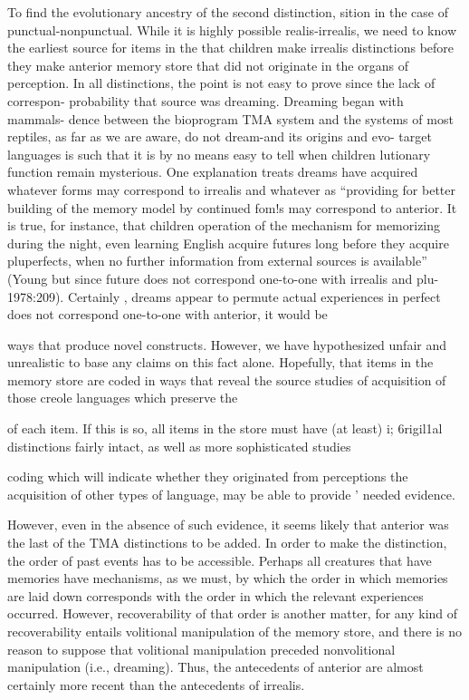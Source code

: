 To find the evolutionary ancestry of the second distinction, sition in the case of punctual-nonpunctual. While it is highly possible realis-irrealis, we need to know the earliest source for items in the that children make irrealis distinctions before they make anterior memory store that did not originate in the organs of perception. In all distinctions, the point is not easy to prove since the lack of correspon- probability that source was dreaming. Dreaming began with mammals- dence between the bioprogram TMA system and the systems of most reptiles, as far as we are aware, do not dream-and its origins and evo- target languages is such that it is by no means easy to tell when children lutionary function remain mysterious. One explanation treats dreams have acquired whatever forms may correspond to irrealis and whatever as ``providing for better building of the memory model by continued fom!s may correspond to anterior. It is true, for instance, that children operation of the mechanism for memorizing during the night, even learning English acquire futures long before they acquire pluperfects, when no further information from external sources is available'' (Young but since future does not correspond one-to-one with irrealis and plu- 1978:209). Certainly , dreams appear to permute actual experiences in perfect does not correspond one-to-one with anterior, it would be

ways that produce novel constructs. However, we have hypothesized unfair and unrealistic to base any claims on this fact alone. Hopefully, that items in the memory store are coded in ways that reveal the source studies of acquisition of those creole languages which preserve the

of each item. If this is so, all items in the store must have (at least) i; 6rigil1al distinctions fairly intact, as well as more sophisticated studies

coding which will indicate whether they originated from perceptions the acquisition of other types of language, may be able to provide ' needed evidence.


However, even in the absence of such evidence, it seems likely that anterior was the last of the TMA distinctions to be added. In order to make the distinction, the order of past events has to be accessible. Perhaps all creatures that have memories have mechanisms, as we must, by which the order in which memories are laid down corresponds with the order in which the relevant experiences occurred. However, recover\-ability of that order is another matter, for any kind of recoverability entails volitional manipulation of the memory store, and there is no reason to suppose that volitional manipulation preceded nonvolitional manipulation (i.e., dreaming). Thus, the antecedents of anterior are almost certainly more recent than the antecedents of irrealis.

